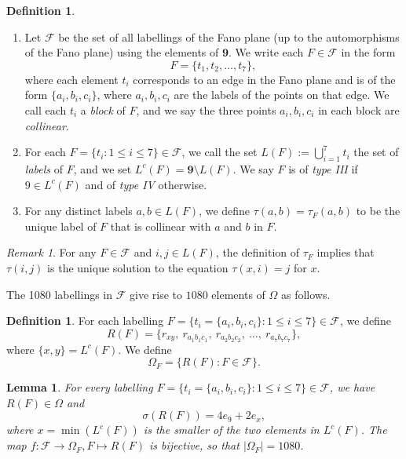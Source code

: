\documentclass[11pt]{amsart}
\theoremstyle{plain}
\newtheorem{lemma}[theorem]{Lemma}
\theoremstyle{definition}
\newtheorem{defn}[theorem]{Definition}
\theoremstyle{remark}
\newtheorem{rmk}[theorem]{Remark}
\numberwithin{equation}{section}
\newcommand{\ra}{\rightarrow}
\newcommand{\lc}{L^c}
\newcommand{\calf}{\mathcal{F}}
\newcommand{\rr}{r}
\newcommand{\nine}{\mathbf{9}}
\newcommand{\ob}{\Omega}
\newcommand{\fob}{\Omega_F}
\newcommand{\abs}[1]{\lvert #1 \rvert}
\begin{document}
\begin{defn}\label{def:fdef}
\begin{enumerate}
  \item Let $\calf$ be the set of all labellings of the Fano plane (up to the
  automorphisms of the Fano plane) using the elements of
  $\nine$. We write each $F\in \calf$ in the form 
  \[
  F = \{t_1, t_2, \dots, t_7\}, 
  \]
  where each element $t_i$ corresponds to an edge in the Fano plane and is of
  the form $\{a_i,b_i,c_i\}$, where $a_i, b_i, c_i$ are the labels of the points
  on that edge. We  call each $t_i$ a {\it block} of $F$, and we say the three
  points $a_i, b_i, c_i$ in each block are \emph{collinear}. 

\item For each $F=\{t_i:1\le i\le 7\}\in \calf$, we call the set 
$L(F) := \bigcup_{i=1}^7 t_i$ the set of {\it labels} of $F$, and we set
$\lc(F)=\nine\setminus L(F)$.
We say $F$ is of \emph{type III} if $9\in \lc(F)$ and
  of \emph{type IV} otherwise.

\item  For any distinct labels $a,b\in L(F)$, we define $\tau(a,b)=\tau_F(a,b)$ to be the unique
  label of $F$ that is collinear with $a$ and $b$ in $F$.    
\end{enumerate}
\end{defn}

\begin{rmk}
\label{rmk:sol}
For any $F\in \calf$ and $i,j\in L(F)$, the definition of $\tau_F$ implies that $\tau(i,j)$ is the unique solution to the equation $\tau(x,i)=j$ for $x$.
\end{rmk}

The 1080 labellings in $\calf$ give rise to $1080$ elements of $\ob$ as
follows.  


\begin{defn}
\label{defn:fob_construction}
For each labelling $F=\{t_i=\{a_i,b_i,c_i\}: 1\le i\le 7\}\in \calf$, we
  define 
  \[  
R(F) = \{\rr_{xy}, \ \rr_{a_1b_1c_1}, \ \rr_{a_2b_2c_2}, \ \dots, \
\rr_{a_7b_7c_7}\},
  \]
  where $\{x,y\}=\lc(F)$.
We define \[ \fob=\{R(F):F\in \calf\}. \]
\end{defn}

\begin{lemma}
\label{lemm:fob_sum}
For every labelling 
$F=\{t_i=\{a_i,b_i,c_i\}: 1\le i\le 7\}\in \calf$,
we have $R(F)\in\ob$ and
\begin{equation}
  \label{eq:fob_sum}
  \sigma(R(F)) = 4e_9 + 2e_x,
\end{equation}
where $x=\min(\lc(F))$ is the smaller of the two elements in $\lc(F)$.
The map $f: \calf\ra \fob, F\mapsto R(F)$ is bijective, so that
$\abs{\fob}=1080$.
\end{lemma}
\end{document}

